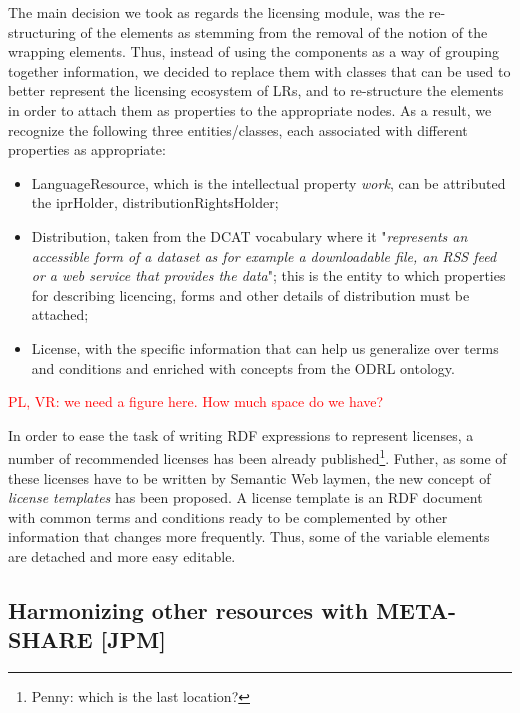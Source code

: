\documentclass{llncs}
\begin{document}
{The main decision we took as regards the licensing module, was the re-structuring of the elements as stemming from the removal of the notion of the wrapping elements. Thus, instead of using the components as a way of grouping together information, we decided to replace them with classes that can be used to better represent the licensing ecosystem of LRs, and to re-structure the elements in order to attach them as properties to the appropriate nodes. As a result, we recognize the following three entities/classes, each associated with different properties as appropriate:
\begin{itemize}
\item LanguageResource, which is the intellectual property \textit{work}, can be attributed the iprHolder, distributionRightsHolder;
\item Distribution, taken from the DCAT vocabulary where it "\textit{represents an accessible form of a dataset as for example a downloadable file, an RSS feed or a web service that provides the data}"; this is the entity to which properties for describing licencing, forms and other details of distribution must be attached;
\item License, with the specific information that can help us generalize over terms and conditions and enriched with concepts from the ODRL ontology. 
\end{itemize}
\textcolor{red}{PL, VR: we need a figure here. How much space do we have?}

In order to ease the task of writing RDF expressions to represent licenses, a number of recommended licenses has been already published\footnote{Penny: which is the last location?}. Futher, as some of these licenses have to be written by Semantic Web laymen, the new concept of \textit{license templates} has been proposed. A license template is an RDF document with common terms and conditions ready to be complemented by other information that changes more frequently. Thus, some of the variable elements are detached and more easy editable.

\subsection{Harmonizing other resources with META-SHARE [JPM]}
\label{sec:harmonization}

}
\end{document}
